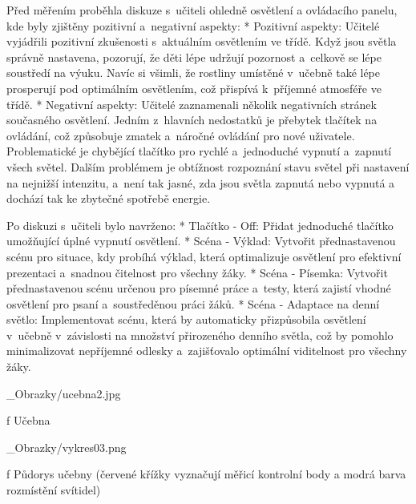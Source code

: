 \medskip\noindent
Před měřením proběhla diskuze s~učiteli ohledně osvětlení a ovládacího panelu, kde byly zjištěny pozitivní a~negativní aspekty:
\begitems
    * {\sbf Pozitivní aspekty:}
    Učitelé vyjádřili pozitivní zkušenosti s~aktuálním osvětlením ve třídě. Když jsou světla správně nastavena,
    pozorují, že děti lépe udržují pozornost a~celkově se lépe soustředí na výuku. Navíc si všimli, že rostliny
    umístěné v~učebně také lépe prosperují pod optimálním osvětlením, což přispívá k~příjemné atmosféře ve třídě.
    \medskip
    * {\sbf Negativní aspekty:}
    Učitelé zaznamenali několik negativních stránek současného osvětlení. Jedním z~hlavních nedostatků je přebytek
    tlačítek na ovládání, což způsobuje zmatek a~náročné ovládání pro nové uživatele. Problematické je chybějící
    tlačítko pro rychlé a~jednoduché vypnutí a~zapnutí všech světel. Dalším problémem je obtížnost rozpoznání
    stavu světel při nastavení na nejnižší intenzitu, a~není tak jasné, zda jsou světla zapnutá nebo vypnutá
    a dochází tak ke zbytečné spotřebě energie.
\enditems

\medskip\noindent
Po diskuzi s~učiteli bylo navrženo:
\begitems
    * {\sbf Tlačítko - Off:} Přidat jednoduché tlačítko umožňující úplné vypnutí osvětlení.
    * {\sbf Scéna - Výklad:} Vytvořit přednastavenou scénu pro situace, kdy probíhá výklad, která optimalizuje
        osvětlení pro efektivní prezentaci a~snadnou čitelnost pro všechny žáky.
    * {\sbf Scéna - Písemka:} Vytvořit přednastavenou scénu určenou pro písemné práce a~testy, která
        zajistí vhodné osvětlení pro psaní a~soustředěnou práci žáků.
    * {\sbf Scéna - Adaptace na denní světlo:} Implementovat scénu, která by automaticky přizpůsobila
        osvětlení v~učebně v~závislosti na množství přirozeného denního světla, což by pomohlo minimalizovat
        nepříjemné odlesky a~zajišťovalo optimální viditelnost pro všechny žáky.
\enditems

\medskip {}
\picw=8cm _Obrazky/ucebna2.jpg
\caption/f Učebna
\medskip

\medskip {}
\picw=20cm _Obrazky/vykres03.png
\caption/f Půdorys učebny (červené křížky vyznačují měřicí kontrolní body a modrá barva rozmístění svítidel)
\medskip







